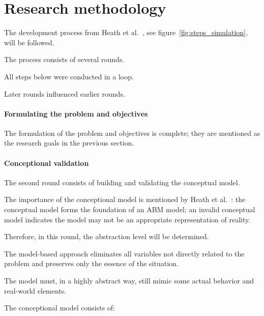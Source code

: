 
\section{Research methodology}

The development process from Heath et al.~\cite{heath2009survey}, see figure~\ref{fig:steps_simulation},  will be followed.



The process consists of several rounds.

All steps below were conducted in a loop.

Later rounds influenced earlier rounds.



\paragraph{Formulating the problem and objectives}

The formulation of the problem and objectives is complete; they are mentioned as the research goals in the previous section.



\paragraph{Conceptional validation}

The second round consists of building and validating the conceptual model.




The importance of the conceptional model is mentioned by Heath et al.~\cite{heath2009survey}: the conceptual model forms the foundation of an ABM model; an invalid conceptual model indicates the model may not be an appropriate representation of reality.



Therefore, in this round, the abstraction level will be determined.

The model-based approach eliminates all variables not directly related to the problem and preserves only the essence of the situation.

The model must, in a highly abstract way, still mimic some actual behavior and real-world elements.



The conceptional model consists of:\\

